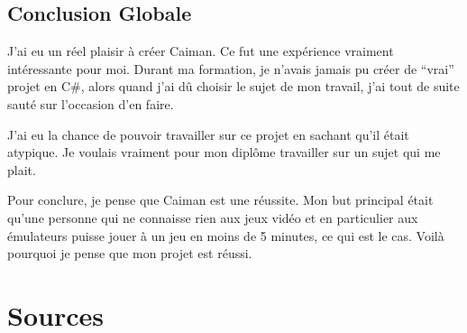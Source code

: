 \documentclass[a4paper,12pt,french]{sphinxmanual}
\begin{document}
\section{Conclusion Globale}
\label{\detokenize{conclusion:conclusion-globale}}
\sphinxAtStartPar
J’ai eu un réel plaisir à créer Caiman. Ce fut une expérience vraiment intéressante pour moi. Durant ma formation, je n’avais jamais pu créer de “vrai” projet en C\#, alors quand j’ai dû choisir le sujet de mon travail, j’ai tout de suite sauté sur l’occasion d’en faire.

\sphinxAtStartPar
J’ai eu la chance de pouvoir travailler sur ce projet en sachant qu’il était atypique. Je voulais vraiment pour mon diplôme travailler sur un sujet qui me plait.

\sphinxAtStartPar
Pour conclure, je pense que Caiman est une réussite. Mon but principal était qu’une personne qui ne connaisse rien aux jeux vidéo et en particulier aux émulateurs puisse jouer à un jeu en moins de 5 minutes, ce qui est le cas. Voilà pourquoi je pense que mon projet est réussi.


\chapter{Sources}
\label{\detokenize{sources:sources}}\label{\detokenize{sources::doc}}
\sphinxAtStartPar
{}

\sphinxAtStartPar
{}

\sphinxAtStartPar
{}

\sphinxAtStartPar
{}

\sphinxAtStartPar
{}

\sphinxAtStartPar
{}

\sphinxAtStartPar
{}

\sphinxAtStartPar
{}

\sphinxAtStartPar
{}
\end{document}

